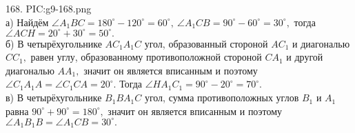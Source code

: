 168. {{PIC:g9-168.png}}\\
а) Найдём $\angle A_1BC=180^\circ-120^\circ=60^\circ,\ \angle A_1CB=90^\circ-60^\circ=30^\circ,$ тогда $\angle ACH=20^\circ+30^\circ=50^\circ.$\\
б) В четырёхугольнике $AC_1A_1C$ угол, образованный стороной $AC_1$ и диагональю $CC_1,$ равен углу, образованному противоположной стороной $CA_1$ и другой диагональю $AA_1,$ значит он является вписанным и поэтому $\angle C_1A_1A=\angle C_1CA=20^\circ.$ Тогда $\angle HA_1C_1=90^\circ-20^\circ=70^\circ.$\\
в) В четырёхугольнике $B_1BA_1C$ угол, сумма противоположных углов $B_1$ и $A_1$ равна $90^\circ+90^\circ=180^\circ,$ значит он является вписанным и поэтому
$\angle A_1B_1B=\angle A_1CB=30^\circ.$\\
